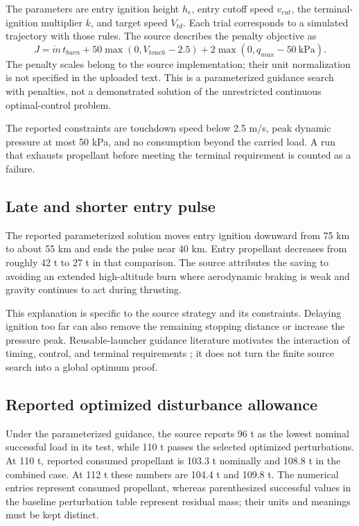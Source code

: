 \documentclass[11pt,a4paper]{article}
\begin{document}


The parameters are entry ignition height $h_e$, entry cutoff speed $v_{cut}$, the terminal-ignition multiplier $k$, and target speed $V_{td}$. Each trial corresponds to a simulated trajectory with those rules. The source describes the penalty objective as
\begin{equation}
 J=\dot m\,t_{burn}
 +50\max(0,V_{touch}-2.5)
 +2\max(0,q_{max}-50\ \mathrm{kPa}).
\label{eq:objective}
\end{equation}
The penalty scales belong to the source implementation; their unit normalization is not specified in the uploaded text. This is a parameterized guidance search with penalties, not a demonstrated solution of the unrestricted continuous optimal-control problem.

The reported constraints are touchdown speed below 2.5 m/s, peak dynamic pressure at most 50 kPa, and no consumption beyond the carried load. A run that exhausts propellant before meeting the terminal requirement is counted as a failure.

\subsection{Late and shorter entry pulse}


The reported parameterized solution moves entry ignition downward from 75 km to about 55 km and ends the pulse near 40 km. Entry propellant decreases from roughly 42 t to 27 t in that comparison. The source attributes the saving to avoiding an extended high-altitude burn where aerodynamic braking is weak and gravity continues to act during thrusting.

This explanation is specific to the source strategy and its constraints. Delaying ignition too far can also remove the remaining stopping distance or increase the pressure peak. Reusable-launcher guidance literature motivates the interaction of timing, control, and terminal requirements \cite{wilken,simplicio,botelho}; it does not turn the finite source search into a global optimum proof.

\subsection{Reported optimized disturbance allowance}


Under the parameterized guidance, the source reports 96 t as the lowest nominal successful load in its test, while 110 t passes the selected optimized perturbations. At 110 t, reported consumed propellant is 103.3 t nominally and 108.8 t in the combined case. At 112 t these numbers are 104.4 t and 109.8 t. The numerical entries represent consumed propellant, whereas parenthesized successful values in the baseline perturbation table represent residual mass; their units and meanings must be kept distinct.
\end{document}
